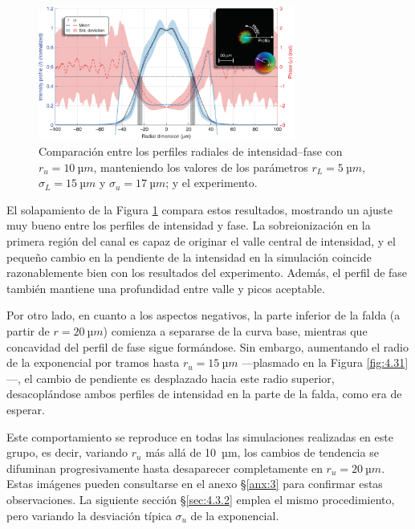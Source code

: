 \begin{figure}[htbp]
  \centering
  \includegraphics[width=0.75\textwidth]{Figuras/ch4_cmp71.png}
  \caption{Comparación entre los perfiles radiales de intensidad--fase con $r_{u}=\qty{10}{µm}$, manteniendo los valores de los parámetros $r_{L}=\qty{5}{µm}$, $\sigma_{L}=\qty{15}{µm}$ y $\sigma_{u}=\qty{17}{µm}$; y el experimento.}
  \label{fig:4.30}
\end{figure}

El solapamiento de la Figura \ref{fig:4.30} compara estos resultados, mostrando un ajuste muy bueno entre los perfiles de intensidad y fase. La sobreionización en la primera región del canal es capaz de originar el valle central de intensidad, y el pequeño cambio en la pendiente de la intensidad en la simulación coincide razonablemente bien con los resultados del experimento. Además, el perfil de fase también mantiene una profundidad entre valle y picos aceptable.

Por otro lado, en cuanto a los aspectos negativos, la parte inferior de la falda (a partir de $r=\qty{20}{µm}$) comienza a separarse de la curva base, mientras que concavidad del perfil de fase sigue formándose. Sin embargo, aumentando el radio de la exponencial por tramos hasta $r_{u}=\qty{15}{µm}$ ---plasmado en la Figura \ref{fig:4.31}---, el cambio de pendiente es desplazado hacia este radio superior, desacoplándose ambos perfiles de intensidad en la parte de la falda, como era de esperar.

Este comportamiento se reproduce en todas las simulaciones realizadas en este grupo, es decir, variando $r_{u}$ más allá de \qty{10}{µm}, los cambios de tendencia se difuminan progresivamente hasta desaparecer completamente en $r_{u}=\qty{20}{µm}$. Estas imágenes pueden consultarse en el anexo \S\ref{anx:3} para confirmar estas observaciones. La siguiente sección \S\ref{sec:4.3.2} emplea el mismo procedimiento, pero variando la desviación típica $\sigma_{u}$ de la exponencial.

